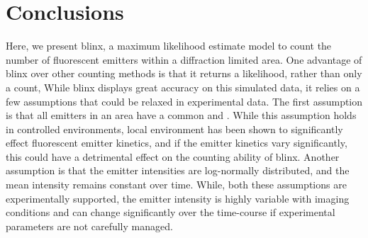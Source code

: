 \section{Conclusions}
Here, we present blinx, a maximum likelihood estimate model to count the number of fluorescent emitters within a diffraction limited area.
%
One advantage of blinx over other counting methods is that it returns a likelihood, rather than only a count,
While blinx displays great accuracy on this simulated data, it relies on a few assumptions that could be relaxed in experimental data.
%
The first assumption is that all emitters in an area have a common \pon and \poff. 
%
While this assumption holds in controlled environments, local environment has been shown to significantly effect fluorescent emitter kinetics, and if the emitter kinetics vary significantly, this could have a detrimental effect on the counting ability of blinx. 
%
Another assumption is that the emitter intensities are log-normally distributed, and the mean intensity remains constant over time. While, both these assumptions are experimentally supported, the emitter intensity is highly variable with imaging conditions and can change significantly over the time-course if experimental parameters are not carefully managed. 
%




